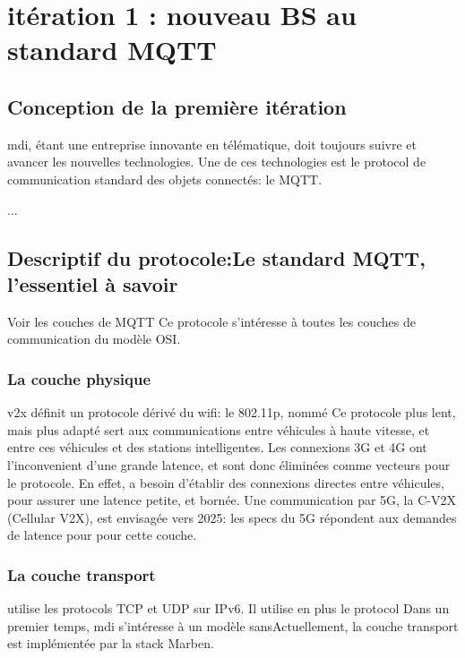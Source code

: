 \section{itération 1 : nouveau BS au standard MQTT}
    \subsection{Conception de la première itération}
        \gls{mdi}, étant une entreprise innovante en télématique, doit toujours
        suivre et avancer les nouvelles technologies. Une de ces technologies
        est le protocol de communication standard des objets connectés: le MQTT.

        ...
        


    \subsection{Descriptif du protocole:Le standard MQTT, l'essentiel à savoir}
        Voir les couches de MQTT
        Ce protocole s'intéresse à toutes les couches de communication du modèle OSI.
       
        \subsubsection{La couche physique}
           v2x définit un protocole dérivé du wifi: le 802.11p, nommé 
            Ce protocole plus lent, mais plus adapté sert aux communications entre
            véhicules à haute vitesse, et entre ces véhicules et des stations intelligentes.
            Les connexions 3G et 4G ont l'inconvenient d'une grande latence, et sont donc
            éliminées comme vecteurs pour le protocole. En effet, a besoin
            d'établir des connexions directes entre véhicules, pour assurer une latence
            petite, et bornée.
            Une communication par 5G, la C-V2X (Cellular V2X), est envisagée vers
            2025: les specs du 5G répondent aux demandes de latence pour 
            pour cette couche.


        \subsubsection{La couche transport}
             utilise les protocols TCP et UDP sur IPv6. Il utilise en plus
            le protocol  Dans un premier temps, \gls{mdi}
            s'intéresse à un modèle sansActuellement, la couche transport
            est implémentée par la stack Marben.

